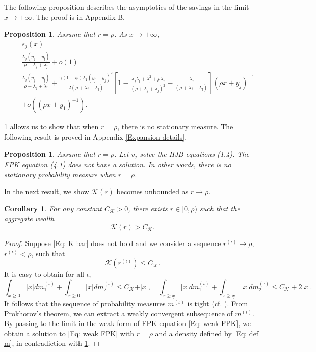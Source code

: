 \documentclass[11pt]{article}
\numberwithin{equation}{section}
\newtheorem{prop}[thm]{Proposition}
\newtheorem{cor}[thm]{Corollary}
\theoremstyle{definition}
\def\i{{(\iota)}}
\newcommand{\ux}{{\underline x}}
\newcommand{\beq}{\begin{equation}}
\newcommand{\eeq}{\end{equation}}
\newcommand{\ld}{\lambda}
\newcommand{\g}{\gamma}
\newcommand{\p}{\psi}
\theoremstyle{plain}
\begin{document}
The following proposition describes the asymptotics of the savings in the limit $x\to +\infty$.  {}{The proof is in Appendix B.}
\begin{prop}\label{Prop: sj asmp}
{}{Assume that $r=\rho$.} As $x\to +\infty$, 
\beq\label{Eq: sj asmp}
   \begin{aligned}
  &s_j(x)\\
  ={}&\frac{\ld_j(y_j-y_{\bar \jmath})}{\rho+\lambda_j+\lambda_{\bar \jmath}}+o(1)\\
  ={}&\frac{\lambda_j(y_j-y_{\bar \jmath})}{\rho+\lambda_j+\lambda_{\bar \jmath}}+\frac{\g (1+\p)\lambda_1(y_{\bar \jmath}-y_j)^2}{2(\rho+\lambda_j+\lambda_{\bar \jmath})}\left[1-\frac{\lambda_j\lambda_{\bar \jmath}+\lambda_{\bar \jmath}^2+\rho \lambda_j}{(\rho+\lambda_j+\lambda_{\bar \jmath})^2}-\frac{\lambda_j}{(\rho+\lambda_j+\lambda_{\bar \jmath})}\right](\rho x+y_j)^{-1}\\
&+o((\rho x+y_1)^{-1}).
   \end{aligned}
  \eeq
\end{prop}

{\cref{Prop: sj asmp} allows us to show that when $r=\rho$, there is no stationary measure. The following result is proved in Appendix \ref{Expansion details}.}
\begin{prop}\label{Prop: no sol FPK}
Assume that $r=\rho$.  Let  $v_j$ solve the HJB equations (1.4). {}{The FPK equation (4.1) does not have a solution.} In other words, there is no stationary probability measure  when $r=\rho$.
\end{prop}
{}{In the next result, we show $\mathcal{K}(r)$ becomes unbounded as $r\to \rho$. }
\begin{cor}\label{Prop: K blows}
For any constant $C_{\mathcal{K}}>0$, there exists $\bar{r}\in [0,\rho)$ such that the aggregate wealth 
\beq\label{Eq: K bar}
\mathcal{K}(\bar{r})>C_{\mathcal{K}}.
\eeq
\end{cor}
\begin{proof}
Suppose \cref{Eq: K bar} does not hold and we consider a sequence $r^\i\to \rho$, $r^\i<\rho$, such that 
$$
\mathcal{K}(r^\i)\leq C_{\mathcal{K}}.
$$
It is easy to obtain for all $\iota$,
$$
\int_{x\geq 0} \vert x\vert dm^\i_1+\int_{x\geq 0} \vert x\vert dm^\i_2\leq C_{\mathcal{K}}+\vert \ux\vert,\quad \int_{x\geq \ux} \vert x\vert dm^\i_1+\int_{x\geq \ux} \vert x\vert dm^\i_2\leq C_{\mathcal{K}}+2\vert \ux\vert.
$$
It follows that the sequence of probability measures $m^\i$ is tight (cf. \cite[Proposition D.5.2 and Lemma D.5.3]{meyn2012markov}). From Prokhorov’s theorem, we can extract a weakly convergent subsequence of $m^\i$. By passing to the limit in the weak form of FPK equation \cref{Eq: weak FPK}, we obtain a solution to \cref{Eq: weak FPK} with $r=\rho$ and a density defined by \cref{Eq: def m}, in contradiction with \cref{Prop: no sol FPK}.
\end{proof}
\end{document}
